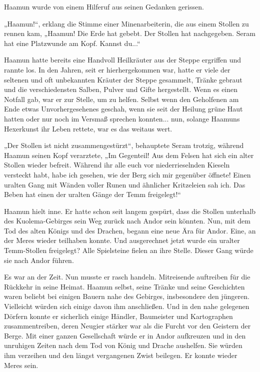 Haamun wurde von einem Hilferuf aus seinen Gedanken gerissen.

„Haamun!“, erklang die Stimme einer Minenarbeiterin, die aus einem Stollen zu rennen kam, „Haamun! Die Erde hat gebebt. Der Stollen hat nachgegeben. Seram hat eine Platzwunde am Kopf. Kannst du...“

Haamun hatte bereits eine Handvoll Heilkräuter aus der Steppe ergriffen und rannte los. In den Jahren, seit er hierhergekommen war, hatte er viele der seltenen und oft unbekannten Kräuter der Steppe gesammelt, Tränke gebraut und die verschiedensten Salben, Pulver und Gifte hergestellt. Wenn es einen Notfall gab, war er zur Stelle, um zu helfen. Selbst wenn den Geholfenen am Ende etwas Unvorhergesehenes geschah, wenn sie seit der Heilung grüne Haut hatten oder nur noch im Versmaß sprechen konnten... nun, solange Haamuns Hexerkunst ihr Leben rettete, war es das weitaus wert.

„Der Stollen ist nicht zusammengestürzt“, behauptete Seram trotzig, während Haamun seinen Kopf verarztete, „Im Gegenteil! Aus dem Felsen hat sich ein alter Stollen wieder befreit. Während ihr alle euch vor niederrieselnden Kieseln versteckt habt, habe ich gesehen, wie der Berg sich mir gegenüber öffnete! Einen uralten Gang mit Wänden voller Runen und ähnlicher Kritzeleien sah ich. Das Beben hat einen der uralten Gänge der Temm freigelegt!“

Haamun hielt inne. Er hatte schon seit langem gespürt, dass die Stollen unterhalb des Kuolema-Gebirges sein Weg zurück nach Andor sein könnten. Nun, mit dem Tod des alten Königs und des Drachen, begann eine neue Ära für Andor. Eine, an der Meres wieder teilhaben konnte. Und ausgerechnet jetzt wurde ein uralter Temm-Stollen freigelegt? Alle Spielsteine fielen an ihre Stelle. Dieser Gang würde sie nach Andor führen.

Es war an der Zeit. Nun musste er rasch handeln. Mitreisende auftreiben für die Rückkehr in seine Heimat. Haamun selbst, seine Tränke und seine Geschichten waren beliebt bei einigen Bauern nahe des Gebirges, insbesondere den jüngeren. Vielleicht würden sich einige davon ihm anschließen. Und in den nahe gelegenen Dörfern konnte er sicherlich einige Händler, Baumeister und Kartographen zusammentreiben, deren Neugier stärker war als die Furcht vor den Geistern der Berge. Mit einer ganzen Gesellschaft würde er in Andor aufkreuzen und in den unruhigen Zeiten nach dem Tod von König und Drache aushelfen. Sie würden ihm verzeihen und den längst vergangenen Zwist beilegen. Er konnte wieder Meres sein.\bigskip







